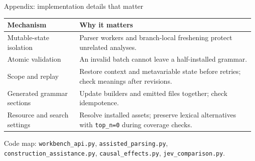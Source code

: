 \documentclass[aspectratio=169,11pt]{beamer}
\newcommand{\code}[1]{\texttt{#1}}
\newcommand{\source}[1]{\par\vfill{\scriptsize\color{Muted}#1}\par}
\begin{document}
\begin{frame}{Appendix: implementation details that matter}
  \color{Ink}
  \begin{tabularx}{\textwidth}{@{}p{37mm}Y@{}}\toprule
    \textbf{Mechanism} & \textbf{Why it matters}\\\midrule
    Mutable-state isolation & Parser workers and branch-local freshening protect unrelated analyses.\\[5pt]
    Atomic validation & An invalid batch cannot leave a half-installed grammar.\\[5pt]
    Scope and replay & Restore context and metavariable state before retries; check meanings after revisions.\\[5pt]
    Generated grammar sections & Update builders and emitted files together; check idempotence.\\[5pt]
    Resource and search settings & Resolve installed assets; preserve lexical alternatives with \code{top\_n=0} during coverage checks.\\\bottomrule
  \end{tabularx}\par
  \source{Code map: \code{workbench\_api.py}, \code{assisted\_parsing.py}, \code{construction\_assistance.py}, \code{causal\_effects.py}, \code{jev\_comparison.py}.}
\end{frame}
\end{document}
